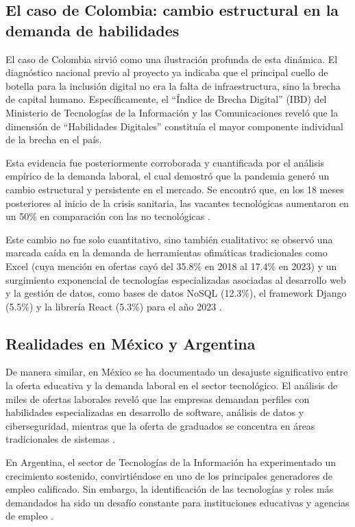 \subsection{El caso de Colombia: cambio estructural en la demanda de habilidades}

El caso de Colombia sirvió como una ilustración profunda de esta dinámica. El diagnóstico nacional previo al proyecto ya indicaba que el principal cuello de botella para la inclusión digital no era la falta de infraestructura, sino la brecha de capital humano. Específicamente, el ``Índice de Brecha Digital'' (IBD) del Ministerio de Tecnologías de la Información y las Comunicaciones reveló que la dimensión de ``Habilidades Digitales'' constituía el mayor componente individual de la brecha en el país.

Esta evidencia fue posteriormente corroborada y cuantificada por el análisis empírico de la demanda laboral, el cual demostró que la pandemia generó un cambio estructural y persistente en el mercado. Se encontró que, en los 18 meses posteriores al inicio de la crisis sanitaria, las vacantes tecnológicas aumentaron en un 50\% en comparación con las no tecnológicas \cite{rubio2024}.

Este cambio no fue solo cuantitativo, sino también cualitativo: se observó una marcada caída en la demanda de herramientas ofimáticas tradicionales como Excel (cuya mención en ofertas cayó del 35.8\% en 2018 al 17.4\% en 2023) y un surgimiento exponencial de tecnologías especializadas asociadas al desarrollo web y la gestión de datos, como bases de datos NoSQL (12.3\%), el framework Django (5.5\%) y la librería React (5.3\%) para el año 2023 \cite{rubio2024}.

\subsection{Realidades en México y Argentina}

De manera similar, en México se ha documentado un desajuste significativo entre la oferta educativa y la demanda laboral en el sector tecnológico. El análisis de miles de ofertas laborales reveló que las empresas demandan perfiles con habilidades especializadas en desarrollo de software, análisis de datos y ciberseguridad, mientras que la oferta de graduados se concentra en áreas tradicionales de sistemas \cite{martinez2024}.

En Argentina, el sector de Tecnologías de la Información ha experimentado un crecimiento sostenido, convirtiéndose en uno de los principales generadores de empleo calificado. Sin embargo, la identificación de las tecnologías y roles más demandados ha sido un desafío constante para instituciones educativas y agencias de empleo \cite{aguilera2018}.

